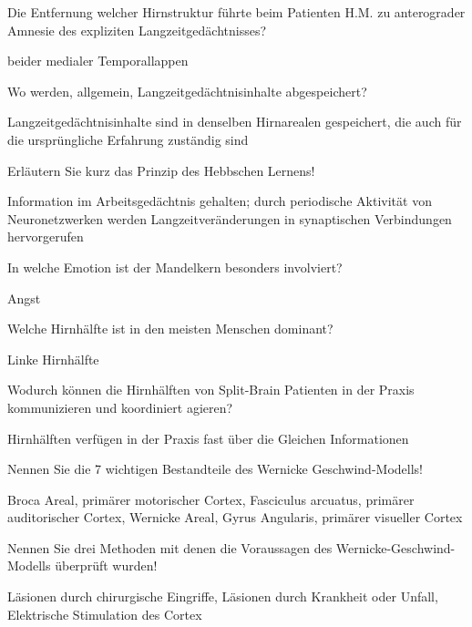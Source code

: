 \documentclass[10pt, a4paper]{exam}
\begin{document}
\begin{questions}
  \question Die Entfernung welcher Hirnstruktur führte beim Patienten H.M. zu anterograder Amnesie des expliziten Langzeitgedächtnisses?
  \begin{solution}
    beider medialer Temporallappen
  \end{solution}

  \question Wo werden, allgemein, Langzeitgedächtnisinhalte abgespeichert?
  \begin{solution}
    Langzeitgedächtnisinhalte sind in denselben Hirnarealen gespeichert, die auch für die ursprüngliche Erfahrung zuständig sind
  \end{solution}

  \question Erläutern Sie kurz das Prinzip des Hebbschen Lernens!
  \begin{solution}
    Information im Arbeitsgedächtnis gehalten; durch periodische Aktivität von Neuronetzwerken werden Langzeitveränderungen in synaptischen Verbindungen hervorgerufen
  \end{solution}

  \question In welche Emotion ist der Mandelkern besonders involviert?
  \begin{solution}
    Angst
  \end{solution}

  \question Welche Hirnhälfte ist in den meisten Menschen dominant?
  \begin{solution}
    Linke Hirnhälfte
  \end{solution}

  \question Wodurch können die Hirnhälften von Split-Brain Patienten in der Praxis kommunizieren und koordiniert agieren?
  \begin{solution}
    Hirnhälften verfügen in der Praxis fast über die Gleichen Informationen
  \end{solution}

  \question Nennen Sie die 7 wichtigen Bestandteile des Wernicke Geschwind-Modells!
  \begin{solution}
    Broca Areal, primärer motorischer Cortex, Fasciculus arcuatus, primärer auditorischer Cortex, Wernicke Areal, Gyrus Angularis, primärer visueller Cortex
  \end{solution}

  \question Nennen Sie drei Methoden mit denen die Voraussagen des Wernicke-Geschwind-Modells überprüft wurden!
  \begin{solution}
    Läsionen durch chirurgische Eingriffe, Läsionen durch Krankheit oder Unfall, Elektrische Stimulation des Cortex
  \end{solution}


\end{questions}
\end{document}
